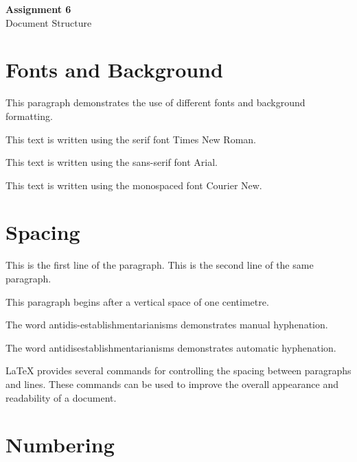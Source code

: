 \documentclass[12pt,a4paper]{article}
\begin{document}
	
	\pagecolor{yellow!10}
	\color{black}
	
	\begin{center}
		{\Huge \textbf{Assignment 6}}\\[0.5cm]
		{\Large Document Structure}\\[0.5cm]
	\end{center}
	
	\thispagestyle{empty}
	
	\section{Fonts and Background}
	
	This paragraph demonstrates the use of different fonts and background formatting.
	
	\begin{trivlist}
		\item {\rmfamily This text is written using the serif font Times New Roman.}
		\item {\sffamily This text is written using the sans-serif font Arial.}
		\item {\ttfamily This text is written using the monospaced font Courier New.}
	\end{trivlist}
	
	
	\section{Spacing}
	
	This is the first line of the paragraph.
	This is the second line of the same paragraph.
	
	\vspace{1cm}
	
	This paragraph begins after a vertical space of one centimetre.
	
	The word antidis-establishmentarianisms demonstrates manual hyphenation.
	
	The word antidisestablishmentarianisms demonstrates automatic hyphenation.
	
	\medskip
	
	LaTeX provides several commands for controlling the spacing between paragraphs and lines. These commands can be used to improve the overall appearance and readability of a document.
	
	\newpage
	
	\setcounter{section}{3}
	
	\section{Numbering}
	
\end{document}
